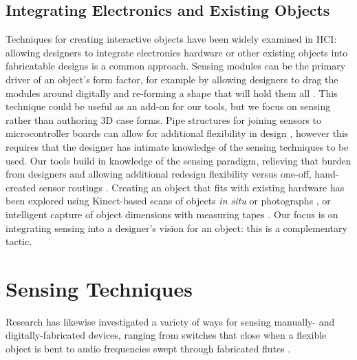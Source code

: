     \subsection{Integrating Electronics and Existing Objects}

    Techniques for creating interactive objects have been widely examined in HCI: allowing designers to integrate electronics hardware or other existing objects into fabricatable designs is a common approach. Sensing modules can be the primary driver of an object's form factor, for example by allowing designers to drag the modules around digitally and re-forming a shape that will hold them all \cite{weichel-enclosed}. This technique could be useful as an add-on for our tools, but we focus on sensing rather than authoring 3D case forms. Pipe structures for joining sensors to microcontroller boards can allow for additional flexibility in design \cite{savage-sot}, however this requires that the designer has intimate knowledge of the sensing techniques to be used. Our tools build in knowledge of the sensing paradigm, relieving that burden from designers and allowing additional redesign flexibility versus one-off, hand-created sensor routings \cite{navarrette-gps, park-microchannels}. Creating an object that fits with existing hardware has been explored using Kinect-based scans of objects \emph{in situ} \cite{molyneaux-kinectfusion, weichel-mixfab} or photographs \cite{lau-modeling}, or intelligent capture of object dimensions with measuring tapes \cite{lee-handscape,weichel-spata}. Our focus is on integrating sensing into a designer's vision for an object: this is a complementary tactic.

\section{Sensing Techniques}

    Research has likewise investigated a variety of ways for sensing manually- and digitally-fabricated devices, ranging from switches that close when a flexible object is bent \cite{slyper-structure} to audio frequencies swept through fabricated flutes \cite{laput-acoustruments}.

